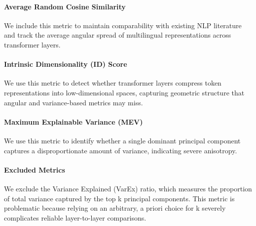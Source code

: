 \paragraph{Average Random Cosine Similarity}
We include this metric to maintain comparability with existing NLP literature and track the average angular spread of multilingual representations across transformer layers.

\paragraph{Intrinsic Dimensionality (ID) Score}
We use this metric to detect whether transformer layers compress token representations into low-dimensional spaces, capturing geometric structure that angular and variance-based metrics may miss.

\paragraph{Maximum Explainable Variance (MEV)}
We use this metric to identify whether a single dominant principal component captures a disproportionate amount of variance, indicating severe anisotropy.

\paragraph{Excluded Metrics}
We exclude the Variance Explained (VarEx) ratio, which measures the proportion of total variance captured by the top k principal components. This metric is problematic because relying on an arbitrary, a priori choice for
k severely complicates reliable layer-to-layer comparisons.



